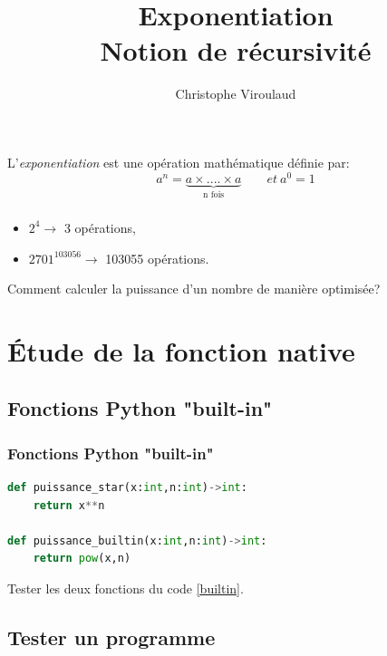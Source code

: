 \documentclass[svgnames,11pt]{beamer}
\author[]{Christophe Viroulaud}
\title{Exponentiation \\Notion de récursivité}
\date{\framebox{\textbf{Lang 05}}}
\institute{Terminale - NSI}
\begin{document}
\begin{frame}
\titlepage
\end{frame}
\begin{frame}
    \frametitle{}
L'\emph{exponentiation} est une opération mathématique définie par:
    $$a^n=\underbrace{a ×....× a}_{\mbox{n fois}}\qquad et\ a^0=1$$


\end{frame}
\begin{frame}
    \frametitle{}

    \begin{itemize}
        \item $2^4 \rightarrow$ 3 opérations,
        \item $2701^{103056} \rightarrow$ 103055 opérations.
    \end{itemize}
\begin{framed}\centering Comment calculer la puissance d'un nombre de manière optimisée?
\end{framed}
\end{frame}
\section{Étude de la fonction native}
\subsection{Fonctions  Python "built-in"}
\begin{frame}[fragile]
    \frametitle{Fonctions  Python "built-in"}

\begin{center}
\begin{lstlisting}[language=Python , basicstyle=\ttfamily\small, xleftmargin=2em, xrightmargin=2em]
def puissance_star(x:int,n:int)->int:
    return x**n

def puissance_builtin(x:int,n:int)->int:
    return pow(x,n)
\end{lstlisting}
\label{builtin}
\end{center}
\begin{activite}
Tester les deux fonctions du code \ref{builtin}.
\end{activite}
\end{frame}
\subsection{Tester un programme}
\end{document}
